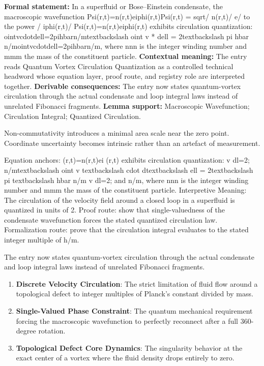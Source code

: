 \begingroup\footnotesize\setlength{\emergencystretch}{3em}\sloppy
\textbf{Formal statement:} In a superfluid or Bose--Einstein condensate, the macroscopic wavefunction Psi(r,t)=n(r,t)eiphi(r,t)Psi(r,t) = sqrt/ n(r,t)/ e/ to the power / iphi(r,t)/ Psi(r,t)=n(r,t)eiphi(r,t) exhibits circulation quantization: ointvcdotdell=2pihbarn/mtextbackslash oint v * dell = 2textbackslash pi hbar n/mointvcdotdell=2pihbarn/m, where nnn is the integer winding number and mmm the mass of the constituent particle. \textbf{Contextual meaning:} The entry reads Quantum Vortex Circulation Quantization as a controlled technical headword whose equation layer, proof route, and registry role are interpreted together. \textbf{Derivable consequences:} The entry now states quantum-vortex circulation through the actual condensate and loop integral laws instead of unrelated Fibonacci fragments. \textbf{Lemma support:} Macroscopic Wavefunction; Circulation Integral; Quantized Circulation.\par
\endgroup

Non-commutativity introduces a minimal area scale near the zero point. Coordinate uncertainty becomes intrinsic rather than an artefact of measurement.

Equation anchors: (r,t)=n(r,t)ei (r,t) exhibits circulation quantization:  v dl=2;  n/mtextbackslash oint v textbackslash cdot dtextbackslash ell = 2textbackslash pi textbackslash hbar n/m v dl=2; and  n/m, where nnn is the integer winding number and mmm the mass of the constituent particle. Interpretive Meaning: The circulation of the velocity field around a closed loop in a superfluid is quantized in units of 2. Proof route: show that single-valuedness of the condensate wavefunction forces the stated quantized circulation law. Formalization route: prove that the circulation integral evaluates to the stated integer multiple of h/m.

The entry now states quantum-vortex circulation through the actual condensate and loop integral laws instead of unrelated Fibonacci fragments.
\endgroup

\begin{enumerate}[leftmargin=1.6em,itemsep=6pt,topsep=4pt]
\item \textbf{Discrete Velocity Circulation}: The strict limitation of fluid flow around a topological defect to integer multiples of Planck's constant divided by mass.
\item \textbf{Single-Valued Phase Constraint}: The quantum mechanical requirement forcing the macroscopic wavefunction to perfectly reconnect after a full 360-degree rotation.
\item \textbf{Topological Defect Core Dynamics}: The singularity behavior at the exact center of a vortex where the fluid density drops entirely to zero.
\end{enumerate}

